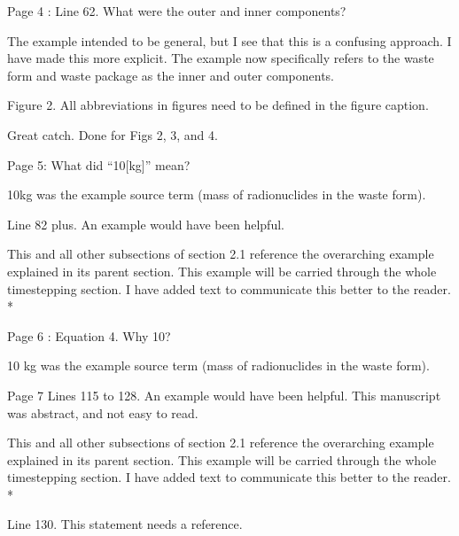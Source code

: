 \documentclass[answers,12pt]{exam}
\begin{document}
\begin{questions}
\question Page 4 : Line 62. What were the outer and inner components?

\begin{solution}
        The example intended to be general, but I see that this is a confusing 
approach. I have made this more explicit. The example now specifically refers 
to the waste form and waste package as the inner and outer components.  
\end{solution}
 

\question Figure 2. All abbreviations in figures need to be defined in the figure caption.
\begin{solution}
Great catch. Done for Figs 2, 3, and 4.
\end{solution}
 

\question Page 5: What did ``10[kg]'' mean?
\begin{solution}
        10kg was the example source term (mass of radionuclides in the waste 
        form).
\end{solution}
 

\question Line 82 plus. An example would have been helpful.
\begin{solution}
This and all other subsections of section 2.1 reference the overarching example 
        explained in its parent section. This example will be carried through 
        the whole timestepping section. I have added text to communicate this 
        better to the reader. 
        {\color{red}*}
\end{solution}

 

\question Page 6 : Equation 4. Why 10?
\begin{solution}
        10 kg was the example source term (mass of radionuclides in the waste 
        form).
\end{solution}

\question Page 7 Lines 115 to 128. An example would have been helpful. This manuscript was abstract, and not easy to read.

\begin{solution}
This and all other subsections of section 2.1 reference the overarching example 
        explained in its parent section. This example will be carried through 
        the whole timestepping section. I have added text to communicate this 
        better to the reader. 
        {\color{red}*}
\end{solution}
 

\question Line 130. This statement needs a reference.


\end{questions}
\end{document}
